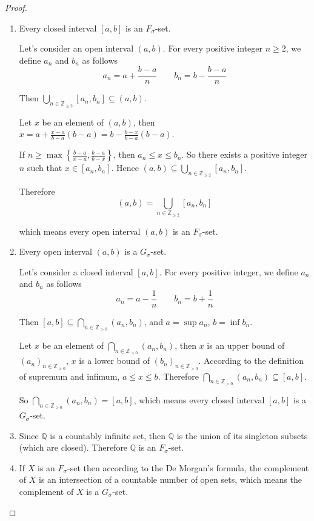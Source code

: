 \begin{proof}
    \begin{enumerate}[label={(\roman*)}]
        \item Every closed interval $[a, b]$ is an $F_{\sigma}$-set.

              Let's consider an open interval $(a, b)$. For every positive integer $n \geq 2$, we define $a_{n}$ and $b_{n}$ as follows
              \[
                  a_{n} = a + \frac{b-a}{n}
                  \qquad
                  b_{n} = b - \frac{b-a}{n}
              \]

              Then $\bigcup_{n\in\mathbb{Z}_{\geq 2}} [a_{n}, b_{n}] \subseteq (a, b)$.

              Let $x$ be an element of $(a, b)$, then $x = a + \frac{x - a}{b - a}(b - a) = b - \frac{b - x}{b - a}(b - a)$.

              If $n\geq \max\left\{ \frac{b-a}{x-a}, \frac{b-a}{b-x} \right\}$, then $a_{n}\leq x\leq b_{n}$. So there exists a positive integer $n$ such that $x\in [a_{n}, b_{n}]$. Hence $(a, b)\subseteq \bigcup_{n\in\mathbb{Z}_{\geq 2}} [a_{n}, b_{n}]$.

              Therefore
              \[
                  (a, b) = \bigcup_{n\in\mathbb{Z}_{\geq 2}} [a_{n}, b_{n}]
              \]

              which means every open interval $(a, b)$ is an $F_{\sigma}$-set.
        \item Every open interval $(a, b)$ is a $G_{\sigma}$-set.

              Let's consider a closed interval $[a, b]$. For every positive integer, we define $a_{n}$ and $b_{n}$ as follows
              \[
                  a_{n} = a - \frac{1}{n}
                  \qquad
                  b_{n} = b + \frac{1}{n}
              \]

              Then $[a, b]\subseteq \bigcap_{n\in\mathbb{Z}_{>0}} (a_{n}, b_{n})$, and $a = \sup a_{n}$, $b = \inf b_{n}$.

              Let $x$ be an element of $\bigcap_{n\in\mathbb{Z}_{> 0}} (a_{n}, b_{n})$, then $x$ is an upper bound of ${(a_{n})}_{n\in\mathbb{Z}_{>0}}$, $x$ is a lower bound of ${(b_{n})}_{n\in\mathbb{Z}_{> 0}}$. According to the definition of supremum and infimum, $a\leq x\leq b$. Therefore $\bigcap_{n\in\mathbb{Z}_{>0}} (a_{n}, b_{n})\subseteq [a, b]$.

              So $\bigcap_{n\in\mathbb{Z}_{>0}} (a_{n}, b_{n}) = [a, b]$, which means every closed interval $[a, b]$ is a $G_{\sigma}$-set.
        \item Since $\mathbb{Q}$ is a countably infinite set, then $\mathbb{Q}$ is the union of its singleton subsets (which are closed). Therefore $\mathbb{Q}$ is an $F_{\sigma}$-set.
        \item If $X$ is an $F_{\sigma}$-set then according to the De Morgan's formula, the complement of $X$ is an intersection of a countable number of open sets, which means the complement of $X$ is a $G_{\sigma}$-set.


\end{enumerate}
\end{proof}
